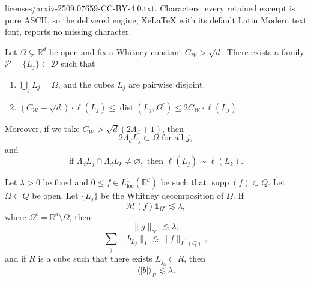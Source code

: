 \documentclass[10pt,a4paper]{amsart}
\newcommand{\D}{\mathscr{D}}
\newcommand{\R}{\mathbb{R}}
\newcommand{\dist}[1]{\operatorname{dist}\left(#1\right) }
\newcommand{\one}{\mathds{1}}
\newcommand{\supp}[1]{\operatorname{supp}\left(#1\right) }
\begin{document}
licenses/arxiv-2509.07659-CC-BY-4.0.txt. Characters: every retained excerpt is pure ASCII, so the delivered engine, XeLaTeX with its default Latin Modern text font, reports no missing character.
\begin{theorem}\label{Whitney}
Let $\Omega\subsetneq\R^d$ be open and fix a Whitney constant $C_{\mathcal{W}}>\sqrt{d}$. There exists a family $\mathcal{P}=\{L_j\} \subset \D$ such that
    \begin{enumerate}
        \item $\bigcup_{j}L_j=\Omega$, and the cubes $L_j$ are pairwise disjoint.
        \item $(C_{\mathcal{W}}-\sqrt{d})\cdot\ell(L_j)\leq \dist{L_j,\Omega^c}\leq 2C_{\mathcal{W}}\cdot \ell(L_j)$.
    \end{enumerate}
Moreover, if we take $C_{\mathcal{W}}>\sqrt{d}(2\Lambda_d+1)$, then
    \[
    2\Lambda_dL_j\subset \Omega  \text{ for all } j,
    \]
    and
    \[
    \text{if }\Lambda_dL_j\cap \Lambda_dL_k\neq\varnothing, \text{ then }\ell(L_j)\sim \ell(L_k).
    \]
\end{theorem}

\begin{lemma}\label{CZdecompProperties}
Let $\lambda>0$ be fixed and $0\leq f\in L_{\mathrm{loc}}^{1}(\R^d)$ be such that $\supp{f}\subset Q$. Let $\Omega \subset Q$ be open. Let $\{L_j\}$ be the Whitney decomposition of $\Omega$. If
    \begin{equation}\label{propiedadMaximalEnElAbierto}
        \mathcal{M}(f)\one_{\Omega^{c}}\lesssim \lambda,
    \end{equation}
where $\Omega^{c}=\R^d\setminus{\Omega}$, then    
\begin{equation}\label{inftyNormGoodPart}
        \|g\|_{\infty}\lesssim \lambda,%
    \end{equation}
    \begin{equation}\label{L1NormBadPart}
        \sum_j \|b_{L_j}\|_{1}\lesssim \|f\|_{L^1(Q)},
    \end{equation}
    and if $R$ is a cube such that there exists $L_{j_0}\subset R$, then
    \begin{equation}\label{1.2_Jose}
        \langle |b|\rangle_{R}\lesssim\lambda.
    \end{equation}
\end{lemma}
\end{document}

